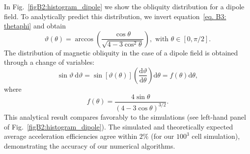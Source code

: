 \documentclass[8pt,a4paper,usenatbib]{mnras}
\newcommand{\de}{\mathrm{d}}
\begin{document}
In Fig.~\ref{figB2:histogram_dipole} we show the obliquity distribution for a
dipole field. To analytically predict this distribution, we invert
equation~\eqref{eq. B3: thetaphi} and obtain
\begin{equation}
  \vartheta (\theta) = \arccos\left( \dfrac{\cos\theta}{\sqrt{4 - 3 \cos^2\theta}} \right),
  \mbox{ with } \theta\in[0,\pi/2].
\end{equation}
The distribution of magnetic obliquity in the case of a dipole field is obtained
through a change of variables:
\begin{equation}
  \sin \vartheta  \ \de \vartheta
  = \sin[\vartheta(\theta)] \left(\dfrac{\de \vartheta}{\de \theta}\right) \de \theta
  = f(\theta) \de  \theta ,
\end{equation}
where 
\begin{equation}
\label{eq. B7:Dtheta}
f(\theta)  = \dfrac{4 \sin\theta}{(4-3\cos\theta)^{3/2}} .
\end{equation}
This analytical result compares favorably to the simulations (see left-hand
panel of Fig.~\ref{figB2:histogram_dipole}). The simulated and theoretically
expected average acceleration efficiencies agree within $2\%$ (for our $100^3$
cell simulation), demonstrating the accuracy of our numerical algorithms.
\end{document}
